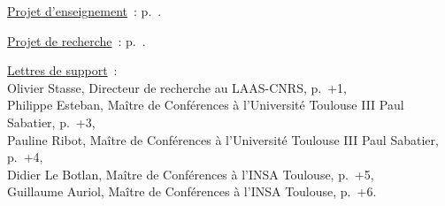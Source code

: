 \vspace{.08in}

\underline{Projet d'enseignement}~: p.~\pageref{projet-enseignement}.\\

\vspace{.01in}

\underline{Projet de recherche}~: p.~\pageref{projet-recherche}.\\

\vspace{.01in}

\underline{Lettres de support}~:\\
\hspace*{.2in}Olivier Stasse, Directeur de recherche au LAAS-CNRS, p.~\the\numexpr{}+1\relax,\\
\hspace*{.2in}Philippe Esteban, Ma\^itre de Conf\'erences \`a l'Universit\'e Toulouse III Paul Sabatier, p.~\the\numexpr{}+3\relax,\\
\hspace*{.2in}Pauline Ribot, Ma\^itre de Conf\'erences \`a l'Universit\'e Toulouse III Paul Sabatier, p.~\the\numexpr{}+4\relax,\\
\hspace*{.2in}Didier Le Botlan, Ma\^itre de Conf\'erences \`a l'INSA Toulouse, p.~\the\numexpr{}+5\relax,\\
\hspace*{.2in}Guillaume Auriol, Ma\^itre de Conf\'erences \`a l'INSA Toulouse, p.~\the\numexpr{}+6\relax.\\